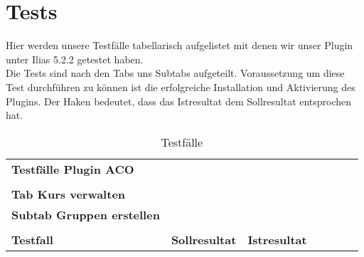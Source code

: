 \chapter{Tests}
\minitoc

Hier werden unsere Testfälle tabellarisch aufgelistet mit denen wir unser Plugin unter Ilias 5.2.2 getestet haben. \\
Die Tests sind nach den Tabs uns Subtabs aufgeteilt. Voraussetzung um diese Test durchführen zu können ist die erfolgreiche Installation und Aktivierung des Plugins.  
Der Haken bedeutet, dass das Istresultat dem Sollresultat entsprochen hat. \\

\begin{table}[]
	\centering
	\caption{Testfälle}
	\label{my-label}
	\begin{tabular}{p{6cm}p{7cm}p{3cm}llll}
	\textbf{\large{Testfälle Plugin ACO } }                                                                                                              &                                                                                                          &             &  &  &  \\
		&                                                                                                                                                                  &             &  &  &  \\
		\textbf{Tab Kurs verwalten}                                                                                                                   &                                                                                                                                                                  &             &  &  &  \\
		\textbf{Subtab Gruppen erstellen }                                                                                                            &                                                                                                                                                                  &             &  &  &  \\
		&                                                                                                                                                                  &             &  &  &  \\
		\textbf{Testfall  }                                                                                                                           & \textbf{Sollresultat  }                                                                                                                                                   &\textbf{ Istresultat} &  &  &  \\

\end{tabular}
\end{table}
